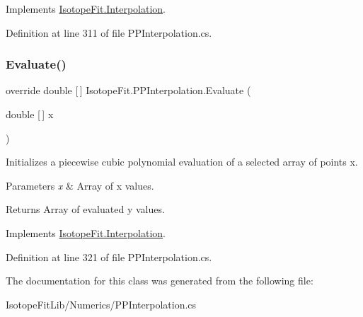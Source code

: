 Implements \mbox{\hyperlink{class_isotope_fit_1_1_interpolation}{Isotope\+Fit.\+Interpolation}}.



Definition at line 311 of file P\+P\+Interpolation.\+cs.

\mbox{\label{class_isotope_fit_1_1_p_p_interpolation_a5a4a1dbfcaa78e520dfc965e64ed227c}} 
\subsubsection{\texorpdfstring{Evaluate()}{Evaluate()}\hspace{0.1cm}{\footnotesize\ttfamily [2/2]}}
{\footnotesize\ttfamily override double \mbox{[}$\,$\mbox{]} Isotope\+Fit.\+P\+P\+Interpolation.\+Evaluate (\begin{DoxyParamCaption}\item[{double \mbox{[}$\,$\mbox{]}}]{x }\end{DoxyParamCaption})\hspace{0.3cm}{\ttfamily [virtual]}}



Initializes a piecewise cubic polynomial evaluation of a selected array of points x. 


\begin{DoxyParams}{Parameters}
{\em x} & Array of x values.\\
\hline
\end{DoxyParams}
\begin{DoxyReturn}{Returns}
Array of evaluated y values.
\end{DoxyReturn}


Implements \mbox{\hyperlink{class_isotope_fit_1_1_interpolation}{Isotope\+Fit.\+Interpolation}}.



Definition at line 321 of file P\+P\+Interpolation.\+cs.



The documentation for this class was generated from the following file\+:\begin{DoxyCompactItemize}
\item 
Isotope\+Fit\+Lib/\+Numerics/P\+P\+Interpolation.\+cs\end{DoxyCompactItemize}

